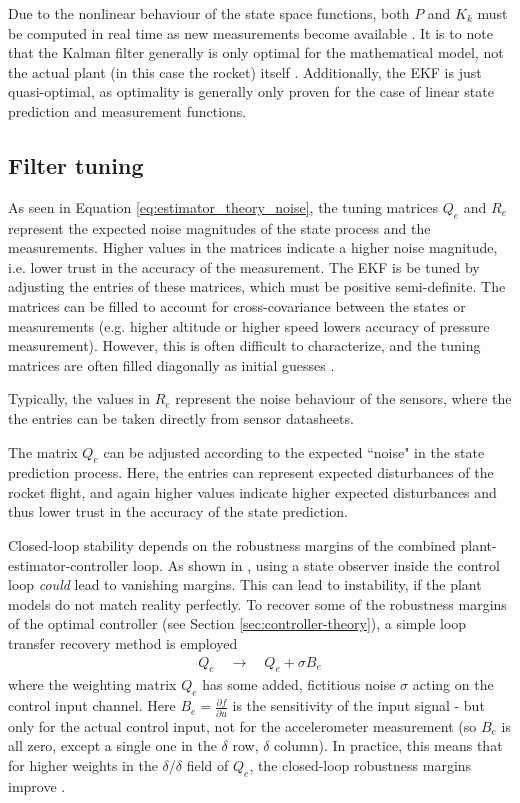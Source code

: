 Due to the nonlinear behaviour of the state space functions, both $P$ and $K_k$ must be computed in real time as new measurements become available \cite{lewis2008}.
It is to note that the Kalman filter generally is only optimal for the mathematical model, not the actual plant (in this case the rocket) itself \cite{lewis2008}.
Additionally, the EKF is just quasi-optimal, as optimality is generally only proven for the case of linear state prediction and measurement functions.

\subsection{Filter tuning}
\label{sec:estimator-tuning}
As seen in Equation \ref{eq:estimator_theory_noise}, the tuning matrices $Q_e$ and $R_e$ represent the expected noise magnitudes of the state process and the measurements.
Higher values in the matrices indicate a higher noise magnitude, i.e. lower trust in the accuracy of the measurement.
The EKF is be tuned by adjusting the entries of these matrices, which must be positive semi-definite.
The matrices can be filled to account for cross-covariance between the states or measurements (e.g. higher altitude or higher speed lowers accuracy of pressure measurement).
However, this is often difficult to characterize, and the tuning matrices are often filled diagonally as initial guesses \cite{werner2021}.

Typically, the values in $R_e$ represent the noise behaviour of the sensors, where the the entries can be taken directly from sensor datasheets.

The matrix $Q_e$ can be adjusted according to the expected ``noise" in the state prediction process. 
Here, the entries can represent expected disturbances of the rocket flight, and again higher values indicate higher expected disturbances and thus lower trust in the accuracy of the state prediction.

Closed-loop stability depends on the robustness margins of the combined plant-estimator-controller loop.
As shown in \cite{doyle1978}, using a state observer inside the control loop \textit{could} lead to vanishing margins.
This can lead to instability, if the plant models do not match reality perfectly.
To recover some of the robustness margins of the optimal controller (see Section \ref{sec:controller-theory}), a simple loop transfer recovery method is employed \cite{werner2021}
\begin{align}
    Q_e \quad \to \quad Q_e + \sigma B_e
\end{align}
where the weighting matrix $Q_e$ has some added, fictitious noise $\sigma$ acting on the control input channel.
Here $B_e = \frac{\partial f}{\partial u}$ is the sensitivity of the input signal - but only for the actual control input, not for the accelerometer measurement (so $B_e$ is all zero, except a single one in the $\delta$ row, $\delta$ column).
In practice, this means that for higher weights in the $\delta$/$\delta$ field of $Q_e$, the closed-loop robustness margins improve \cite{werner2021}.


